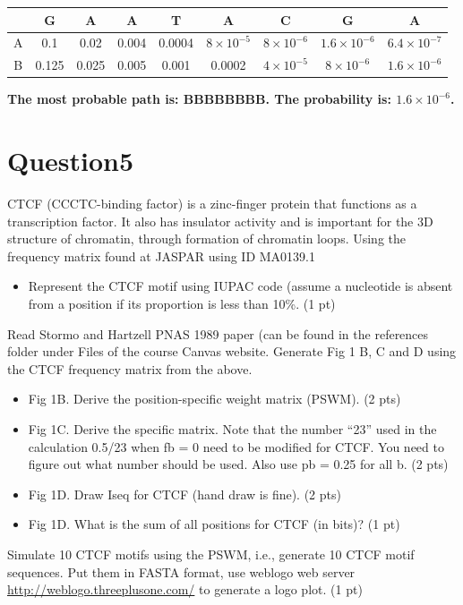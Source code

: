 \documentclass{article}
\begin{document}
\begin{tabular}{|c|c|c|c|c|c|c|c|c|}
    \hline
    &G&A&A&T&A&C&G&A\\
    \hline
    A & 0.1 &0.02 &0.004& 0.0004&$8 \times 10^{-5} $& $8 \times 10^{-6}$& $1.6 \times 10^{-6}$& $6.4 \times 10^{-7}$\\
    \hline
    B& 0.125 &0.025 &0.005& 0.001&0.0002 & $4 \times 10^{-5}$& $8 \times 10^{-6}$& $1.6 \times 10^{-6}$\\
    \hline
\end{tabular}


\textbf{The most probable path is: BBBBBBBB. The probability is: $1.6 \times 10^{-6}$.
}

\section{Question5}

CTCF (CCCTC-binding factor) is a zinc-finger protein that functions as a transcription factor. It also has insulator activity and is important for the 3D structure of chromatin, through formation of chromatin loops. Using the frequency matrix found at JASPAR using ID MA0139.1
\begin{itemize}
    \item Represent the CTCF motif using IUPAC code (assume a nucleotide is absent from a position if its proportion is less than 10\%. (1 pt)

\end{itemize}

Read Stormo and Hartzell PNAS 1989 paper (can be found in the references folder under Files of the course Canvas website. Generate Fig 1 B, C and D using the CTCF frequency matrix from the above.

\begin{itemize}
    \item Fig 1B. Derive the position-specific weight matrix (PSWM). (2 pts) 
    \item Fig 1C. Derive the specific matrix. Note that the number “23” used in the calculation 0.5/23 when fb = 0 need to be modified for CTCF. You need to figure out what number should be used. Also use pb = 0.25 for all b. (2 pts)
    \item Fig 1D. Draw Iseq for CTCF (hand draw is fine). (2 pts)
    \item Fig 1D. What is the sum of all positions for CTCF (in bits)? (1 pt)
\end{itemize}


Simulate 10 CTCF motifs using the PSWM, i.e., generate 10 CTCF motif sequences. Put them in FASTA format, use weblogo web server \href{http://weblogo.threeplusone.com/}{http://weblogo.threeplusone.com/} to generate a logo plot. (1 pt)
\end{document}
